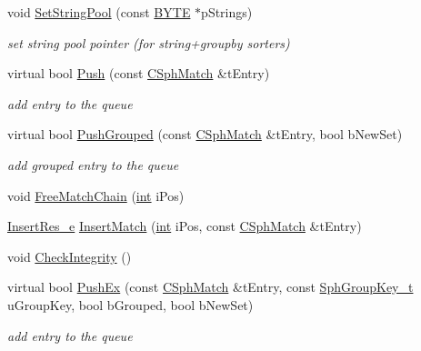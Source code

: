 \begin{DoxyCompactItemize}
void \hyperlink{classCSphKBufferNGroupSorter_aab07d8be83c899077cf9b021b615d237}{Set\-String\-Pool} (const \hyperlink{sphinxstd_8h_a4ae1dab0fb4b072a66584546209e7d58}{B\-Y\-T\-E} $\ast$p\-Strings)
\begin{DoxyCompactList}\small\item\em set string pool pointer (for string+groupby sorters) \end{DoxyCompactList}\item 
virtual bool \hyperlink{classCSphKBufferNGroupSorter_ae9de83c0492d9a47c3e72d05d3b80d8c}{Push} (const \hyperlink{classCSphMatch}{C\-Sph\-Match} \&t\-Entry)
\begin{DoxyCompactList}\small\item\em add entry to the queue \end{DoxyCompactList}\item 
virtual bool \hyperlink{classCSphKBufferNGroupSorter_a8e537840d8ffd539a4365f2eff49c0e8}{Push\-Grouped} (const \hyperlink{classCSphMatch}{C\-Sph\-Match} \&t\-Entry, bool b\-New\-Set)
\begin{DoxyCompactList}\small\item\em add grouped entry to the queue \end{DoxyCompactList}\item 
void \hyperlink{classCSphKBufferNGroupSorter_a4adc6e3f19343bc68630924be432e1e1}{Free\-Match\-Chain} (\hyperlink{sphinxexpr_8cpp_a4a26e8f9cb8b736e0c4cbf4d16de985e}{int} i\-Pos)
\item 
\hyperlink{classCSphKBufferNGroupSorter_a19725f9743cf9362157871c8f61aad87}{Insert\-Res\-\_\-e} \hyperlink{classCSphKBufferNGroupSorter_a1ef321ed63a35d4fce7d0df89b3f6f21}{Insert\-Match} (\hyperlink{sphinxexpr_8cpp_a4a26e8f9cb8b736e0c4cbf4d16de985e}{int} i\-Pos, const \hyperlink{classCSphMatch}{C\-Sph\-Match} \&t\-Entry)
\item 
void \hyperlink{classCSphKBufferNGroupSorter_a1c8928202cedd2db08856a07eaf8c911}{Check\-Integrity} ()
\item 
virtual bool \hyperlink{classCSphKBufferNGroupSorter_aac3dba53e3138bb863990789593f6953}{Push\-Ex} (const \hyperlink{classCSphMatch}{C\-Sph\-Match} \&t\-Entry, const \hyperlink{sphinxsort_8cpp_ab18dbc744a7e1518a776845191f194c8}{Sph\-Group\-Key\-\_\-t} u\-Group\-Key, bool b\-Grouped, bool b\-New\-Set)
\begin{DoxyCompactList}\small\item\em add entry to the queue \end{DoxyCompactList}\item 

\end{DoxyCompactItemize}
